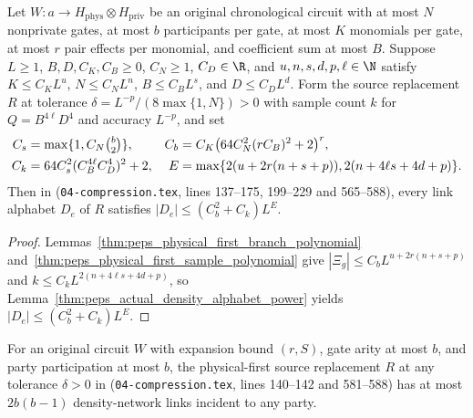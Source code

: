 \begin{lemma}
    \label{thm:peps_actual_physicalFirst_density_polynomial}
    \leanok
    Let $W:a\to H_{\mathrm{phys}}\otimes H_{\mathrm{priv}}$ be an original
    chronological circuit with at most $N$ nonprivate gates, at most $b$
    participants per gate, at most $K$ monomials per gate, at most $r$ pair
    effects per monomial, and coefficient sum at most $B$. Suppose $L\geq1$,
    $B,D,C_K,C_B\geq0$, $C_N\geq1$, $C_D\in\R$, and $u,n,s,d,p,\ell\in\N$
    satisfy $K\leq C_KL^u$, $N\leq C_NL^n$, $B\leq C_BL^s$, and $D\leq C_DL^d$.
    Form the source replacement $R$ at tolerance
    $\delta=L^{-p}/(8\max\{1,N\})>0$ with sample count $k$ for $Q=B^{4\ell}D^4$
    and accuracy $L^{-p}$, and set
    \begin{align}
        C_s & =\max\{1,C_N\tbinom b2\},                  &
        C_b & =C_K\bigl(64C_N^2(rC_B)^2+2\bigr)^r,\notag   \\
        C_k & =64C_s^2(C_B^{4\ell}C_D^4)^2+2,            &
        E   & =\max\{2(u+2r(n+s+p)),2(n+4\ell s+4d+p)\}.
        \label{eq:peps_actual_density_power_constants}
    \end{align}
    Then in \cite[proof of Theorem~5.2]{OpenAI2026PolynomialPEPS}
    (\texttt{04-compression.tex}, lines 137--175, 199--229 and 565--588), every
    link alphabet $D_e$ of $R$ satisfies $|D_e|\leq(C_b^2+C_k)L^E$.
\end{lemma}

\begin{proof}
    \leanok
    Lemmas~\ref{thm:peps_physical_first_branch_polynomial}
    and~\ref{thm:peps_physical_first_sample_polynomial} give
    $|\Xi_g|\leq C_b L^{u+2r(n+s+p)}$ and $k\leq C_k L^{2(n+4\ell s+4d+p)}$,
    so Lemma~\ref{thm:peps_actual_density_alphabet_power} yields
    $|D_e|\leq(C_b^2+C_k)L^E$.
\end{proof}

\begin{lemma}
    \label{thm:peps_actual_physicalFirst_density_incidence}
    \leanok
    For an original circuit $W$ with expansion bound $(r,S)$, gate arity at most
    $b$, and party participation at most $b$, the physical-first source
    replacement $R$ at any tolerance $\delta>0$ in
    \cite[proof of Theorem~5.2]{OpenAI2026PolynomialPEPS}
    (\texttt{04-compression.tex}, lines 140--142 and 581--588) has at most
    $2b(b-1)$ density-network links incident to any party.
\end{lemma}

